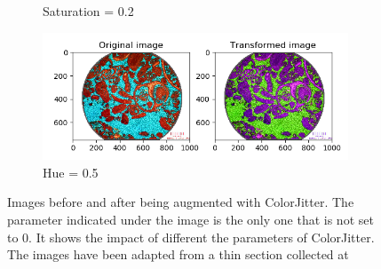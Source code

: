\begin{itemize}
\begin{figure}
\begin{subfigure}{.5\textwidth}
  \caption{Saturation = 0.2}
  \label{fig:saturation}
\end{subfigure}%
\begin{subfigure}{.5\textwidth}
  \centering
  \includegraphics[width=1\linewidth]{figures/03-hue05.PNG}
  \caption{Hue = 0.5}
  \label{fig:hue}
\end{subfigure}
\caption[Color Jitter Augmentation]{Images before and after being augmented with ColorJitter. The parameter indicated under the image is the only one that is not set to 0. It shows the impact of different the parameters of ColorJitter. The images have been adapted from a thin section collected at \cite{section}}
\label{fig:colorjitter}
\end{figure}


\end{itemize}
